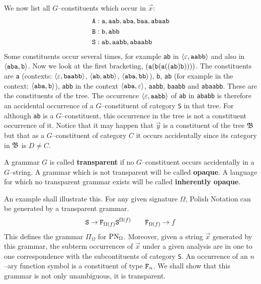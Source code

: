 We now list all $G$--constituents which occur in $\vec{x}$:
\begin{align}\notag
\mbox{\tt A} & : \mbox{\tt a}, \mbox{\tt aab}, \mbox{\tt aba},
    \mbox{\tt baa}, \mbox{\tt abaab} \\
\mbox{\tt B} & : \mbox{\tt b}, \mbox{\tt abb} \\\notag
\mbox{\tt S} & : \mbox{\tt ab}, \mbox{\tt aabb}, \mbox{\tt abaabb}
\end{align}
Some constituents occur several times, for example
{\tt ab} in $\langle \varepsilon, \mbox{\tt aabb}\rangle$ and also in
$\langle \mbox{\tt aba}, \mbox{\tt b}\rangle$.
Now we look at the first bracketing, $(\mbox{\tt a}(\mbox{\tt b}%
(\mbox{\tt a}((\mbox{\tt ab})\mbox{\tt b}))))$.
The constituents are {\tt a} (contexts:
$\langle \varepsilon, \mbox{\tt baabb}\rangle$, $\langle \mbox{\tt ab},
\mbox{\tt abb}\rangle$, $\langle \mbox{\tt aba}, \mbox{\tt bb}\rangle$),
{\tt b}, {\tt ab} (for example in the context: $\auf \mbox{\tt aba}, %
\mbox{\tt b}\zu$), {\tt abb} in the context $\auf \mbox{\tt aba}, %
\varepsilon\zu$, {\tt aabb}, {\tt baabb} and {\tt abaabb}. These
are the constituents of the tree. The occurrence $\auf \varepsilon, %
\mbox{\tt aabb}\zu$ of {\tt ab} in {\tt ababb} is therefore an accidental
occurrence of a $G$--constituent of category {\tt S} in that tree.
For although {\tt ab} is a $G$--constituent, this occurrence in the 
tree is not a constituent occurrence of it. Notice that it may happen 
that $\vec{y}$ is a constituent of the tree $\mathfrak{B}$ but that as a 
$G$--constituent of category $C$ it occurs accidentally since its 
category in $\mathfrak{B}$ is $D \neq C$.
\begin{defn}
A grammar $G$ is called \textbf{transparent} if no $G$--constituent
occurs accidentally in a $G$--string. A grammar which is not
transparent will be called \textbf{opaque}. A language for which
no transparent grammar exists will be called \textbf{inherently
opaque}.
\end{defn}
An example shall illustrate this. For any given signature 
$\Omega$, Polish Notation 
can be generated by a transparent grammar. 
\begin{equation}
\mbox{\tt S} \rightarrow \mbox{\tt F}_{\Omega(f)} \mbox{\tt S}^{\Omega(f)}
\qquad
\mbox{\tt F}_{\Omega(f)} \rightarrow f 
\end{equation}
\index{$\Pi_{\Omega}$}%
This defines the grammar $\Pi_{\Omega}$ for $\operatorname{PN}_{\Omega}$.
Moreover, given a string $\vec{x}$ generated by this grammar, 
the subterm occurrences of $\vec{x}$ under a given analysis are 
in one to one correspondence with the subcontituents of category 
{\tt S}. An occurrence of an $n$--ary function symbol is a 
constituent of type $\mbox{\tt F}_n$. We shall show that this 
grammar is not only unambiguous, it is transparent. 

